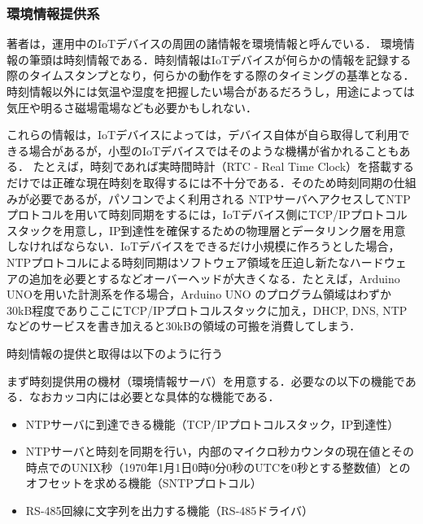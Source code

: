 {%

\subsubsection{環境情報提供系}


著者は，運用中のIoTデバイスの周囲の諸情報を環境情報と呼んでいる．
環境情報の筆頭は時刻情報である．時刻情報はIoTデバイスが何らかの情報を記録する際のタイムスタンプとなり，何らかの動作をする際のタイミングの基準となる．
時刻情報以外には気温や湿度を把握したい場合があるだろうし，用途によっては気圧や明るさ磁場電場なども必要かもしれない．

これらの情報は，IoTデバイスによっては，デバイス自体が自ら取得して利用できる場合があるが，小型のIoTデバイスではそのような機構が省かれることもある．
たとえば，時刻であれば実時間時計（RTC - Real Time Clock）を搭載するだけでは正確な現在時刻を取得するには不十分である．そのため時刻同期の仕組みが必要であるが，パソコンでよく利用される NTPサーバへアクセスしてNTPプロトコルを用いて時刻同期をするには，IoTデバイス側にTCP/IPプロトコルスタックを用意し，IP到達性を確保するための物理層とデータリンク層を用意しなければならない．IoTデバイスをできるだけ小規模に作ろうとした場合，NTPプロトコルによる時刻同期はソフトウェア領域を圧迫し新たなハードウェアの追加を必要とするなどオーバーヘッドが大きくなる．たとえば，Arduino UNO\cite{data:Arduino}を用いた計測系を作る場合，Arduino UNO のプログラム領域はわずか 30kB程度でありここにTCP/IPプロトコルスタックに加え，DHCP, DNS, NTP などのサービスを書き加えると30kBの領域の可搬を消費してしまう．\\



 \par

時刻情報の提供と取得は以下のように行う

まず時刻提供用の機材（環境情報サーバ）を用意する．必要なの以下の機能である．なおカッコ内には必要とな具体的な機能である．

\begin{itemize}
\item NTPサーバに到達できる機能（TCP/IPプロトコルスタック，IP到達性）
\item NTPサーバと時刻を同期を行い，内部のマイクロ秒カウンタの現在値とその時点でのUNIX秒（1970年1月1日0時0分0秒のUTCを0秒とする整数値）とのオフセットを求める機能（SNTPプロトコル）
\item RS-485回線に文字列を出力する機能（RS-485ドライバ）
\end{itemize}

}
